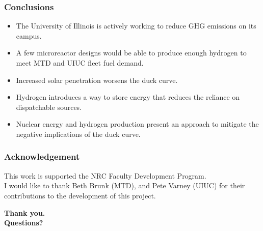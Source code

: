 \begin{frame}
\frametitle{Conclusions}

\begin{itemize}
	\item The University of Illinois is actively working to reduce GHG emissions on its campus. 
	\item A few microreactor designs would be able to produce enough hydrogen to meet MTD and UIUC fleet fuel demand.
	\item Increased solar penetration worsens the duck curve.
	\item Hydrogen introduces a way to store energy that reduces the reliance on dispatchable sources.
	\item Nuclear energy and hydrogen production present an approach to mitigate the negative implications of the duck curve.

\end{itemize}
\end{frame}


\begin{frame}
\frametitle{Acknowledgement}

This work is supported the NRC Faculty Development Program.
\\
I would like to thank Beth Brunk (MTD), and Pete Varney (UIUC) for their contributions to the development of this project.

\end{frame}


\begin{frame}
  \begin{center}
    \Huge{\textbf{Thank you.\\ Questions?}}
  \end{center}
\end{frame}
